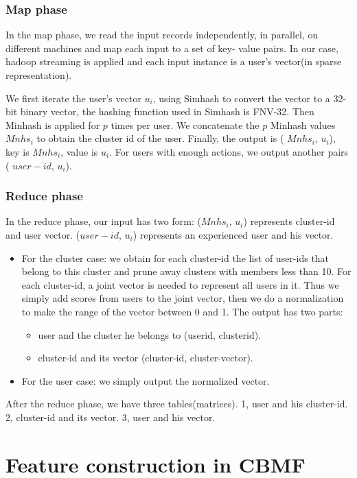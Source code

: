 \subsubsection{Map phase}
In the map phase, we read the input records independently, in parallel, on different machines and map each input to a set of key-
value pairs. In our case, hadoop streaming is applied and each input instance is a user's vector(in sparse representation).

We first iterate the user's vector $u_i$, using Simhash to convert the vector to a 32-bit binary vector, the hashing function used in Simhash is FNV-32. Then Minhash is applied for $p$ times per user. We concatenate the $p$ Minhash values $Mnhs_i$ to obtain the cluster id of the user. Finally, the output is ( $Mnhs_i$, $u_i$), key is $Mnhs_i$, value is $u_i$. For users with enough actions, we output another pairs ( $user-id$, $u_i$). 

\subsubsection{Reduce phase}

In the reduce phase, our input has two form: ($Mnhs_i$, $u_i$) represents cluster-id and user vector. ($user-id$, $u_i$) represents an experienced user and his vector.
\begin{itemize}
\item For the cluster case: we obtain for each cluster-id the list of user-ids that belong to this cluster and prune away clusters with members less than 10. For each cluster-id, a joint vector is needed to represent all users in it. Thus we simply add scores from users to the joint vector, then we do a normalization to make the range of the vector between 0 and 1. The output has two parts: 
\begin{itemize}
\item user and the cluster he belongs to (userid, clusterid). 
\item cluster-id and its vector (cluster-id, cluster-vector).
\end{itemize}
\item For the user case: we simply output the normalized vector.

\end{itemize}

After the reduce phase, we have three tables(matrices). 1, user and his cluster-id. 2, cluster-id and its vector. 3, user and his vector.

\section{Feature construction in CBMF}

